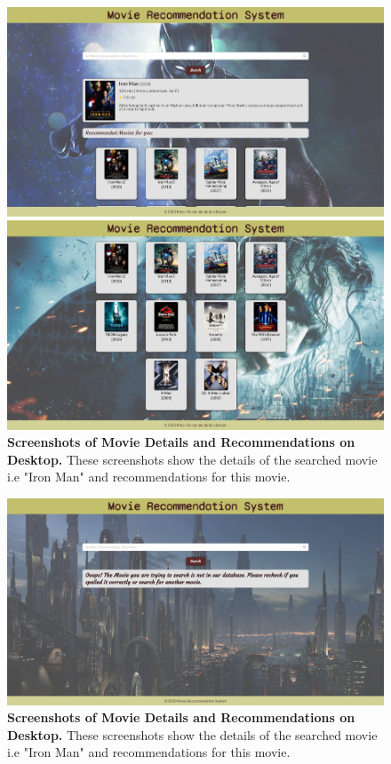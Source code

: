 \begin{figure}[ht]
	\centering
  	\includegraphics[width=1.0\textwidth]{images/laptop_2.JPG}
	\caption{\textbf{Screenshots of Movie Details and Recommendations on Desktop.} These screenshots show the details of the searched movie i.e "Iron Man" and recommendations for this movie.}
  	\label{fig:laptop-2}
\end{figure}

\begin{figure}[ht]
	\centering
  	\includegraphics[width=1.0\textwidth]{images/laptop_error.JPG}
	\caption{\textbf{Screenshots of Movie Details and Recommendations on Desktop.} These screenshots show the details of the searched movie i.e "Iron Man" and recommendations for this movie.}
  	\label{fig:laptop-error}
\end{figure}


